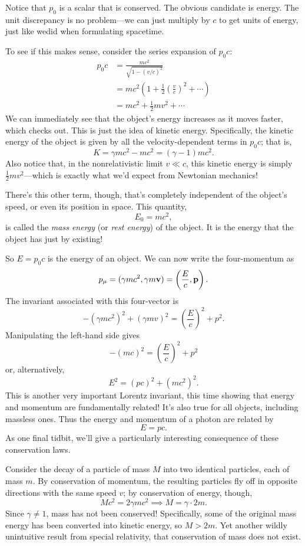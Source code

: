 \documentclass[../p023main.tex]{subfiles}
\begin{document}
Notice that $p_0$ is a scalar that is conserved.
The obvious candidate is energy.
The unit discrepancy is no problem---we can just multiply by $c$ to get units of energy, just like wedid when formulating spacetime.

To see if this makes sense, consider the series expansion of $p_0c$:
\begin{align*}
    p_0c &= \frac{mc^2}{\sqrt{ 1 - \left( v / c \right)^2 }} \\
    &= mc^2 \left( 1 + \frac{1}{2} \left( \frac{v}{c} \right)^2 + \cdots \right) \\
    &= mc^2+ \frac{1}{2}mv^2 + \cdots
\end{align*}
We can immediately see that the object's energy increases as it moves faster, which checks out.
This is just the idea of kinetic energy.
Specifically, the kinetic energy of the object is given by all the velocity-dependent terms in $p_0c$; that is,
\[ K = \gamma mc^2 - mc^2 = (\gamma - 1)mc^2. \]
Also notice that, in the nonrelativistic limit $v \ll c$, this kinetic energy is simply $\frac{1}{2}mv^2$---which is exactly what we'd expect from Newtonian mechanics!

There's this other term, though, that's completely independent of the object's speed, or even its position in space.
This quantity,
\[ E_0 = mc^2, \]
is called the \textit{mass energy} (or \textit{rest energy}) of the object.
It is the energy that the object has just by existing!

So $E = p_0c$ is the energy of an object.
We can now write the four-momentum as
\[ p_\mu = (\gamma mc^2, \gamma m\mathbf{v}) = \left( \frac{E}{c}, \mathbf{p} \right). \]
The invariant associated with this four-vector is
\[ -(\gamma mc^2)^2 + (\gamma mv)^2 = \left( \frac{E}{c} \right)^2 + p^2. \]
Manipulating the left-hand side gives
\[ -(mc)^2 = \left( \frac{E}{c} \right)^2 + p^2 \]
or, alternatively,
\[ E^2 = (pc)^2 + (mc^2)^2. \]
This is another very important Lorentz invariant, this time showing that energy and momentum are fundamentally related!
It's also true for all objects, including massless ones.
Thus the energy and momentum of a photon are related by
\[ E = pc. \]
As one final tidbit, we'll give a particularly interesting consequence of these conservation laws.

Consider the decay of a particle of mass $M$ into two identical particles, each of mass $m$.
By conservation of momentum, the resulting particles fly off in opposite directions with the same speed $v$; by conservation of energy, though,
\[ Mc^2 = 2 \gamma mc^2 \implies M = \gamma \cdot 2m. \]
Since $\gamma \neq 1$, mass has not been conserved!
Specifically, some of the original mass energy has been converted into kinetic energy, so $M > 2m$.
Yet another wildly unintuitive result from special relativity, that conservation of mass does not exist.
\end{document}
